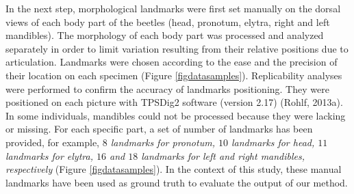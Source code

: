 \documentclass[review]{elsarticle}
\begin{document}
In the next step, morphological landmarks were first set manually on the dorsal views of each body part of the beetles (head, pronotum, elytra, right and left mandibles). The morphology of each body part was processed and analyzed separately in order to limit variation resulting from their relative positions due to articulation. Landmarks were chosen according to the ease and the precision of their location on each specimen (Figure \ref{figdatasamples}). Replicability analyses were performed to confirm the accuracy of landmarks positioning. They were positioned on each picture with TPSDig2 software (version 2.17) (Rohlf, 2013a). In some individuals, mandibles could not be processed because they were lacking or missing. For each specific part, a set of number of landmarks has been provided, for example, \textit{$8$ landmarks for pronotum, $10$ landmarks for head, $11$ landmarks for elytra, $16$ and $18$ landmarks for left and right mandibles, respectively} (Figure \ref{figdatasamples}). In the context of this study, these manual landmarks have been used as ground truth to evaluate the output of our method.
\end{document}
